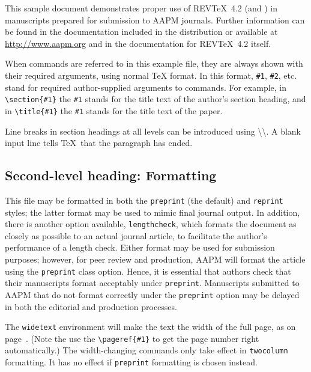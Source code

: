 \documentclass[%
 aapm,
 mph,%
 amsmath,amssymb,
preprint,%
 reprint,%
]{revtex4-2}
\begin{document}
This sample document demonstrates proper use of REV\TeX~4.2 (and
\LaTeXe) in manuscripts prepared for submission to AAPM
journals. Further information can be found in the documentation included in the distribution or available at
\url{http://www.aapm.org} and in the documentation for
REV\TeX~4.2 itself.

When commands are referred to in this example file, they are always
shown with their required arguments, using normal \TeX{} format. In
this format, \verb+#1+, \verb+#2+, etc. stand for required
author-supplied arguments to commands. For example, in
\verb+\section{#1}+ the \verb+#1+ stands for the title text of the
author's section heading, and in \verb+\title{#1}+ the \verb+#1+
stands for the title text of the paper.

Line breaks in section headings at all levels can be introduced using
\textbackslash\textbackslash. A blank input line tells \TeX\ that the
paragraph has ended.

\subsection{\label{sec:level2}Second-level heading: Formatting}

This file may be formatted in both the \texttt{preprint} (the default) and
\texttt{reprint} styles; the latter format may be used to
mimic final journal output. In addition, there is another
option available, \texttt{lengthcheck}, which formats the document as closely
as possible to an actual journal article, to facilitate the author's
performance of a length check. Either format may be used for submission
purposes; however, for peer review and production, AAPM will format the
article using the \texttt{preprint} class option. Hence, it is
essential that authors check that their manuscripts format acceptably
under \texttt{preprint}. Manuscripts submitted to AAPM that do not
format correctly under the \texttt{preprint} option may be delayed in
both the editorial and production processes.

The \texttt{widetext} environment will make the text the width of the
full page, as on page~\pageref{eq:wideeq}. (Note the use the
\verb+\pageref{#1}+ to get the page number right automatically.) The
width-changing commands only take effect in \texttt{twocolumn}
formatting. It has no effect if \texttt{preprint} formatting is chosen
instead.
\end{document}

